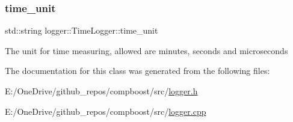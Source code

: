 \subsubsection{\texorpdfstring{time\+\_\+unit}{time\_unit}}
{\footnotesize\ttfamily std\+::string logger\+::\+Time\+Logger\+::time\+\_\+unit\hspace{0.3cm}{\ttfamily [private]}}



The unit for time measuring, allowed are {\ttfamily minutes}, {\ttfamily seconds} and {\ttfamily microseconds} 



The documentation for this class was generated from the following files\+:\begin{DoxyCompactItemize}
\item 
E\+:/\+One\+Drive/github\+\_\+repos/compboost/src/\mbox{\hyperlink{logger_8h}{logger.\+h}}\item 
E\+:/\+One\+Drive/github\+\_\+repos/compboost/src/\mbox{\hyperlink{logger_8cpp}{logger.\+cpp}}\end{DoxyCompactItemize}
